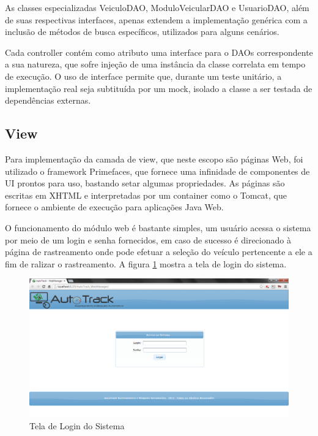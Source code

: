 As classes especializadas VeiculoDAO, ModuloVeicularDAO e UsuarioDAO, além de suas respectivas interfaces, apenas extendem a implementação genérica com a inclusão de métodos de busca específicos, utilizados para alguns cenários.

Cada controller contém como atributo uma interface para o DAOs correspondente a sua natureza, que sofre injeção de uma instância da classe correlata em tempo de execução. O uso de interface permite que, durante um teste unitário, a implementação real seja subtituída por um mock, isolado a classe a ser testada de dependências externas.

\subsection{View}

Para implementação da camada de view, que neste escopo são páginas Web, foi utilizado o framework Primefaces, que fornece uma infinidade de componentes de UI prontos para uso, bastando setar algumas propriedades. As páginas são escritas em XHTML e interpretadas por um container como o Tomcat, que fornece o ambiente de execução para aplicações Java Web.

O funcionamento do módulo web é bastante simples, um usuário acessa o sistema por meio de um login e senha fornecidos, em caso de sucesso é direcionado à página de rastreamento onde pode efetuar a seleção do veículo pertencente a ele a fim de ralizar o rastreamento. A figura \ref{fig:webmanviewlogin} mostra a tela de login do sistema.

\begin{figure}[!htb]
	\centering
	\includegraphics[width=15.00cm\textwidth]{figures/webmanager_login.png}
	\caption{Tela de Login do Sistema}
	\label{fig:webmanviewlogin}
\end{figure}


